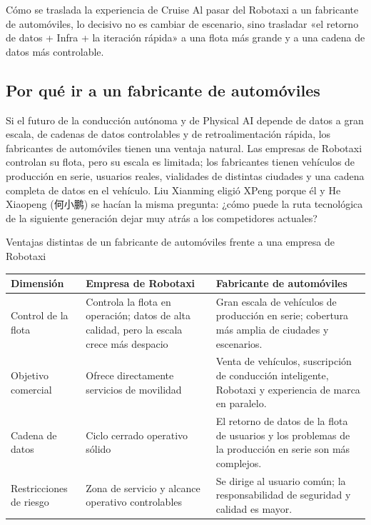 \begin{importantbox}{Cómo se traslada la experiencia de Cruise}
Al pasar del Robotaxi a un fabricante de automóviles, lo decisivo no es cambiar de escenario, sino trasladar «el retorno de datos + Infra + la iteración rápida» a una flota más grande y a una cadena de datos más controlable.
\end{importantbox}

\subsection{Por qué ir a un fabricante de automóviles}

Si el futuro de la conducción autónoma y de Physical AI depende de datos a gran escala, de cadenas de datos controlables y de retroalimentación rápida, los fabricantes de automóviles tienen una ventaja natural. Las empresas de Robotaxi controlan su flota, pero su escala es limitada; los fabricantes tienen vehículos de producción en serie, usuarios reales, vialidades de distintas ciudades y una cadena completa de datos en el vehículo. Liu Xianming eligió XPeng porque él y He Xiaopeng (何小鹏) se hacían la misma pregunta: ¿cómo puede la ruta tecnológica de la siguiente generación dejar muy atrás a los competidores actuales?

\begin{knowledgebox}{Ventajas distintas de un fabricante de automóviles frente a una empresa de Robotaxi}
\begin{tabularx}{\textwidth}{p{}p{}X}
\toprule
Dimensión & Empresa de Robotaxi & Fabricante de automóviles \\
\midrule
Control de la flota & Controla la flota en operación; datos de alta calidad, pero la escala crece más despacio & Gran escala de vehículos de producción en serie; cobertura más amplia de ciudades y escenarios. \\
Objetivo comercial & Ofrece directamente servicios de movilidad & Venta de vehículos, suscripción de conducción inteligente, Robotaxi y experiencia de marca en paralelo. \\
Cadena de datos & Ciclo cerrado operativo sólido & El retorno de datos de la flota de usuarios y los problemas de la producción en serie son más complejos. \\
Restricciones de riesgo & Zona de servicio y alcance operativo controlables & Se dirige al usuario común; la responsabilidad de seguridad y calidad es mayor. \\
\bottomrule
\end{tabularx}
\end{knowledgebox}

